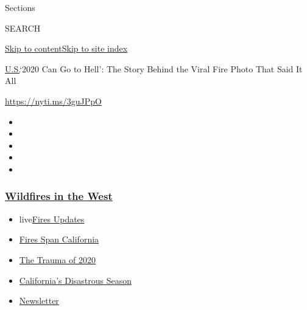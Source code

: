 Sections

SEARCH

\protect\hyperlink{site-content}{Skip to
content}\protect\hyperlink{site-index}{Skip to site index}

\href{/section/us}{U.S.}\textbar{}`2020 Can Go to Hell': The Story
Behind the Viral Fire Photo That Said It All

\url{https://nyti.ms/3guJPpO}

\begin{itemize}
\item
\item
\item
\item
\item
\end{itemize}

\hypertarget{wildfires-in-the-west}{%
\subsubsection{\texorpdfstring{\href{https://www.nytimes3xbfgragh.onion/spotlight/california-wildfires?name=styln-california-wildfires\&region=TOP_BANNER\&block=storyline_menu_recirc\&action=click\&pgtype=Article\&impression_id=9ed63a20-f2ba-11ea-a96b-f1b6e8bed79f\&variant=undefined}{Wildfires
in the West}}{Wildfires in the West}}\label{wildfires-in-the-west}}

\begin{itemize}
\tightlist
\item
  live\href{https://www.nytimes3xbfgragh.onion/2020/09/09/us/wildfires-live-updates.html?name=styln-california-wildfires\&region=TOP_BANNER\&block=storyline_menu_recirc\&action=click\&pgtype=Article\&impression_id=9ed63a21-f2ba-11ea-a96b-f1b6e8bed79f\&variant=undefined}{Fires
  Updates}
\item
  \href{https://www.nytimes3xbfgragh.onion/2020/09/07/us/ca-wildfires-heatwave.html?name=styln-california-wildfires\&region=TOP_BANNER\&block=storyline_menu_recirc\&action=click\&pgtype=Article\&impression_id=9ed66130-f2ba-11ea-a96b-f1b6e8bed79f\&variant=undefined}{Fires
  Span California}
\item
  \href{https://www.nytimes3xbfgragh.onion/2020/08/26/us/california-wildfires-lake-berryessa.html?name=styln-california-wildfires\&region=TOP_BANNER\&block=storyline_menu_recirc\&action=click\&pgtype=Article\&impression_id=9ed66131-f2ba-11ea-a96b-f1b6e8bed79f\&variant=undefined}{The
  Trauma of 2020}
\item
  \href{https://www.nytimes3xbfgragh.onion/article/why-does-california-have-wildfires.html?name=styln-california-wildfires\&region=TOP_BANNER\&block=storyline_menu_recirc\&action=click\&pgtype=Article\&impression_id=9ed66132-f2ba-11ea-a96b-f1b6e8bed79f\&variant=undefined}{California's
  Disastrous Season}
\item
  \href{https://www.nytimes3xbfgragh.onion/2020/09/08/us/california-wildfire-heat-wave.html?name=styln-california-wildfires\&region=TOP_BANNER\&block=storyline_menu_recirc\&action=click\&pgtype=Article\&impression_id=9ed66133-f2ba-11ea-a96b-f1b6e8bed79f\&variant=undefined}{Newsletter}
\end{itemize}

